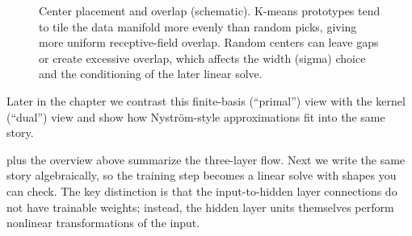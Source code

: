 \begin{figure}[t]
    \centering
\caption{Center placement and overlap (schematic). K-means prototypes tend to tile the data manifold more evenly than random picks, giving more uniform receptive-field overlap. Random centers can leave gaps or create excessive overlap, which affects the width (sigma) choice and the conditioning of the later linear solve.}
    \label{fig:rbf_centres}
\end{figure}
\FloatBarrier



Later in the chapter we contrast this finite-basis (``primal'') view with the kernel (``dual'') view and show how Nystr\"om-style approximations fit into the same story.

 plus the overview above summarize the three-layer flow. Next we write the same story algebraically, so the training step becomes a linear solve with shapes you can check.
The key distinction is that the input-to-hidden layer connections do not have trainable weights; instead, the hidden layer units themselves perform nonlinear transformations of the input.

